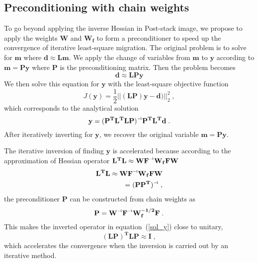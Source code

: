 \subsection*{Preconditioning with chain weights}

To go beyond applying the inverse Hessian in Post-stack image, we propose to apply the weights $\mathbf{W}$ and $\mathbf{W_{f}}$ to form a preconditioner to speed up the convergence of iterative least-square migration. The original problem is to solve for $\mathbf{m}$ where $\mathbf{d \approx Lm}$. We apply the change of variables from $\mathbf{m}$ to $\mathbf{y}$ according to $\mathbf{m} = \mathbf{Py}$ where $\mathbf{P}$ is the preconditioning matrix. Then the problem becomes
\begin{equation}
    \mathbf{d} \approx \mathbf{LPy}
\end{equation}
We then solve this equation for $\mathbf{y}$ with the least-square objective function 
\begin{equation}
     J(\mathbf{y}) = \frac{1}{2} || \mathbf{(LP)y - d) }||_2 ^2\;,
\end{equation}
which corresponds to the analytical solution
\begin{equation}
    \mathbf{y = \inv{(P^{T}L^{T}LP)}P^{T}L^{T}d}\;.
\label{sol_y}
\end{equation}
After iteratively inverting for $\mathbf{y}$, we recover the original variable $\mathbf{m = Py}$.

The iterative inversion of finding $\mathbf{y}$ is accelerated because according to the approximation of Hessian operator $\mathbf{L^{T}L \approx W\inv{F}W_{f}FW}$
\begin{equation} \label{precondition}
\begin{split}
    \mathbf{L^{T}L \approx W\inv{F}W_{f}FW} \\
            \mathbf{=  \inv{(PP^{T})}}\;,
\end{split}
\end{equation}
the preconditioner $\mathbf{P}$ can be constructed from chain weights as
\begin{equation}
    \mathbf{P = \inv{W}\inv{F}W_{f}^{-1/2}F}\;.
\label{prec}
\end{equation}
This makes the inverted operator in equation~(\ref{sol_y}) close to unitary,
\begin{equation}
    \mathbf{(LP)^{T}LP \approx I}\;,
\end{equation}
which accelerates the convergence when the inversion is carried out by an iterative method.  
